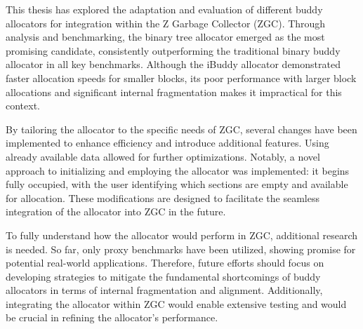 This thesis has explored the adaptation and evaluation of different buddy allocators for integration within the Z Garbage Collector (ZGC). Through analysis and benchmarking, the binary tree allocator emerged as the most promising candidate, consistently outperforming the traditional binary buddy allocator in all key benchmarks. Although the iBuddy allocator demonstrated faster allocation speeds for smaller blocks, its poor performance with larger block allocations and significant internal fragmentation makes it impractical for this context.

By tailoring the allocator to the specific needs of ZGC, several changes have been implemented to enhance efficiency and introduce additional features. Using already available data allowed for further optimizations. Notably, a novel approach to initializing and employing the allocator was implemented: it begins fully occupied, with the user identifying which sections are empty and available for allocation. These modifications are designed to facilitate the seamless integration of the allocator into ZGC in the future.

To fully understand how the allocator would perform in ZGC, additional research is needed. So far, only proxy benchmarks have been utilized, showing promise for potential real-world applications. Therefore, future efforts should focus on developing strategies to mitigate the fundamental shortcomings of buddy allocators in terms of internal fragmentation and alignment. Additionally, integrating the allocator within ZGC would enable extensive testing and would be crucial in refining the allocator's performance.

